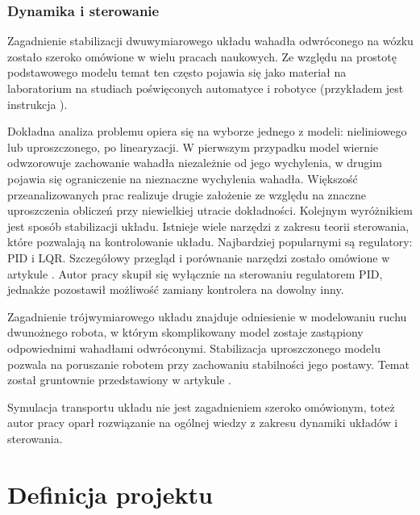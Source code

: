 \documentclass[12pt, oneside]{report}
\theoremstyle{definition}
\begin{document}
\subsection{Dynamika i sterowanie}
Zagadnienie stabilizacji dwuwymiarowego układu wahadła odwróconego na wózku zostało szeroko omówione w wielu pracach naukowych. Ze względu na prostotę podstawowego modelu temat ten często pojawia się jako materiał na laboratorium na studiach poświęconych automatyce i robotyce (przykładem jest instrukcja \cite{LMIP}).

Dokładna analiza problemu opiera się na wyborze jednego z modeli: nieliniowego lub uproszczonego, po linearyzacji. W pierwszym przypadku model wiernie odwzorowuje zachowanie wahadła niezależnie od jego wychylenia, w drugim pojawia się ograniczenie na nieznaczne wychylenia wahadła. Większość przeanalizowanych prac realizuje drugie założenie ze względu na znaczne uproszczenia obliczeń przy niewielkiej utracie dokładności. Kolejnym wyróżnikiem jest sposób stabilizacji układu. Istnieje wiele narzędzi z zakresu teorii sterowania, które pozwalają na kontrolowanie układu. Najbardziej popularnymi są regulatory: PID i LQR. Szczegółowy przegląd i porównanie narzędzi zostało omówione w artykule \cite{OptimalControl}. Autor pracy skupił się wyłącznie na sterowaniu regulatorem PID, jednakże pozostawił możliwość zamiany kontrolera na dowolny inny.

Zagadnienie trójwymiarowego układu znajduje odniesienie w modelowaniu ruchu dwunożnego robota, w którym skomplikowany model zostaje zastąpiony odpowiednimi wahadłami odwróconymi. Stabilizacja uproszczonego modelu pozwala na poruszanie robotem przy zachowaniu stabilności jego postawy. Temat został gruntownie przedstawiony w artykule \cite{BipedWalking}.

Symulacja transportu układu nie jest zagadnieniem szeroko omówionym, toteż autor pracy oparł rozwiązanie na ogólnej wiedzy z zakresu dynamiki układów i sterowania. 


\newpage
\chapter{Definicja projektu}
\end{document}
